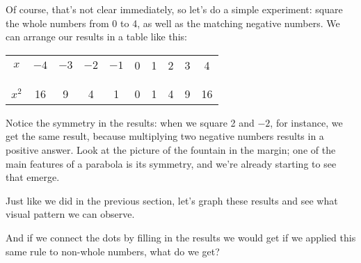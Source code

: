 Of course, that's not clear immediately, so let's do a simple experiment: square the whole numbers from 0 to 4, as well as the matching negative numbers.  We can arrange our results in a table like this:
\begin{center}
\begin{tabular}{c | c c c c c c c c c}
$x$ & $-4$ & $-3$ & $-2$ & $-1$ & 0 & 1 & 2 & 3 & 4\\
& & & & & & & & & \\
\hline
& & & & & & & & & \\
$x^2$ & 16 & 9 & 4 & 1 & 0 & 1 & 4 & 9 & 16
\end{tabular}
\end{center}

Notice the symmetry in the results: when we square 2 and $-2$, for instance, we get the same result, because multiplying two negative numbers results in a positive answer.  Look at the picture of the fountain in the margin; one of the main features of a parabola is its symmetry, and we're already starting to see that emerge.
\pagebreak

Just like we did in the previous section, let's graph these results and see what visual pattern we can observe.
\begin{center}
\end{center}

And if we connect the dots by filling in the results we would get if we applied this same rule to non-whole numbers, what do we get?

